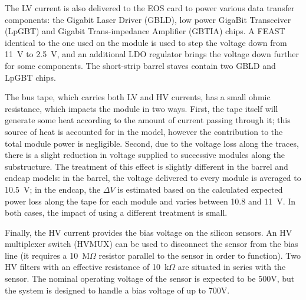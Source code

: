 The LV current is also delivered to the EOS card to power various data transfer components:
the Gigabit Laser Driver (GBLD), low power GigaBit Transceiver (LpGBT) and Gigabit Trans-impedance Amplifier (GBTIA) chips.
A FEAST identical to the one used on the module is used to step the
voltage down from 11~V to 2.5~V, and an additional LDO regulator brings the voltage down further for some components.
The short-strip barrel staves contain two GBLD and LpGBT chips.

The bus tape, which carries both LV and HV currents, has a small ohmic resistance, which impacts the
module in two ways. First,
the tape itself will generate some heat according to the amount of current passing through it; this
source of heat is accounted for in the model, however the contribution to the total module power
is negligible.
Second, due to the voltage loss along the traces, there is a slight reduction in voltage supplied to successive modules along the substructure.
The treatment of this effect is slightly different in the barrel and
endcap models: in the barrel, the voltage delivered to every module is averaged to 10.5~V; in the endcap,
the $\Delta V$ is estimated based on the calculated expected power loss along the tape for each module and varies between 10.8 and 11~V.
In both cases, the impact of using a different treatment is small.

Finally, the HV current provides the bias voltage on the silicon sensors. An HV multiplexer
switch (HVMUX) can be used to disconnect the sensor from the
bias line (it requires a 10~M$\Omega$ resistor parallel to the sensor in order to function). Two HV filters with an effective resistance of 10~k$\Omega$ are situated in series with the
sensor. The nominal operating voltage of the sensor is expected to be 500V, but the system is designed
to handle a bias voltage of up to 700V.
